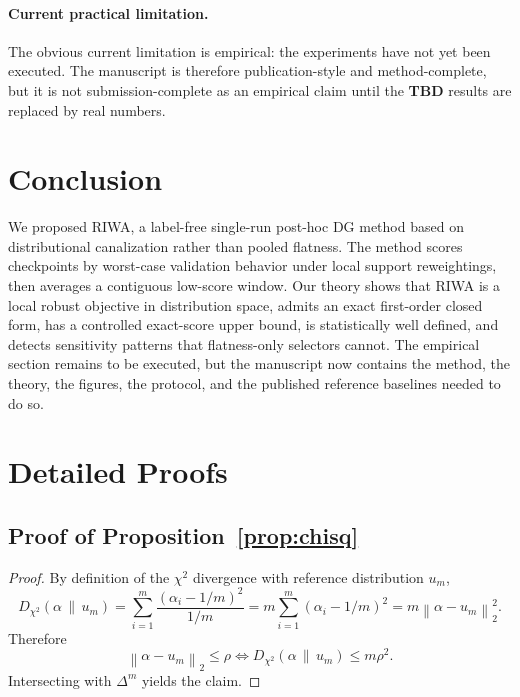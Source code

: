 \documentclass{article}
\newcommand{\TBD}{\textbf{TBD}}
\newcommand{\riwa}{\textup{\textsc{RIWA}}}
\newcommand{\simplex}{\Delta}
\newcommand{\norm}[1]{\left\lVert #1 \right\rVert}
\begin{document}
\paragraph{Current practical limitation.}
The obvious current limitation is empirical: the experiments have not yet been executed. The manuscript is therefore publication-style and method-complete, but it is not submission-complete as an empirical claim until the \TBD{} results are replaced by real numbers.

\section{Conclusion}

We proposed \riwa{}, a label-free single-run post-hoc DG method based on distributional canalization rather than pooled flatness. The method scores checkpoints by worst-case validation behavior under local support reweightings, then averages a contiguous low-score window. Our theory shows that \riwa{} is a local robust objective in distribution space, admits an exact first-order closed form, has a controlled exact-score upper bound, is statistically well defined, and detects sensitivity patterns that flatness-only selectors cannot. The empirical section remains to be executed, but the manuscript now contains the method, the theory, the figures, the protocol, and the published reference baselines needed to do so.




\appendix

\section{Detailed Proofs}

\subsection{Proof of Proposition~\ref{prop:chisq}}

\begin{proof}
By definition of the $\chi^2$ divergence with reference distribution $u_m$,
\begin{equation}
    D_{\chi^2}(\alpha \,\|\, u_m)
    =
    \sum_{i=1}^{m}\frac{(\alpha_i - 1/m)^2}{1/m}
    =
    m\sum_{i=1}^{m}(\alpha_i - 1/m)^2
    =
    m\norm{\alpha - u_m}_2^2.
\end{equation}
Therefore
\begin{equation}
    \norm{\alpha - u_m}_2 \le \rho
    \iff
    D_{\chi^2}(\alpha \,\|\, u_m) \le m\rho^2.
\end{equation}
Intersecting with $\simplex^m$ yields the claim.
\end{proof}
\end{document}

